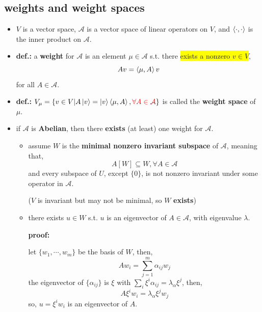 \subsection{weights and weight spaces}
\begin{itemize}
	\item $V$ is a vector space, $\mathcal{A}$ is a vector space of linear operators on $V$, and $\braket{\cdot, \cdot}$ is the inner product on $\mathcal{A}$.
	
	\item \textbf{def.:} a \textbf{weight} for $\mathcal{A}$ is an element $\mu \in \mathcal{A}$ s.t. there \colorbox{yellow}{exists a nonzero $v \in V$},
	\begin{equation}
		A v = \braket{\mu, A} v
	\end{equation}
	for all $A \in \mathcal{A}$.
	
	\item \textbf{def.:} $V_\mu = \{v \in V | A \ket{v} = \ket{v} \braket{\mu, A}, \mathcolor{red}{\forall A \in \mathcal{A}}\}$ is called the \textbf{weight space} of $\mu$.
	
	\item if $\mathcal{A}$ is \textbf{Abelian}, then there \textbf{exists} (at least) one weight for $\mathcal{A}$.
	
	\begin{tcolorbox}[title=proof:]
		\begin{itemize}
			\item assume $W$ is the \textbf{minimal nonzero invariant subspace} of $\mathcal{A}$, meaning that,
			\begin{equation}
				A[W] \subseteq W, \forall A \in \mathcal{A}
			\end{equation}
			and every subspace of $U$, except $\{0\}$, is not nonzero invariant under some operator in $\mathcal{A}$.
			
			($V$ is invariant but may not be minimal, so $W$ \textbf{exists})
			
			\item there exists $u \in W$ s.t. $u$ is an eigenvector of $A \in \mathcal{A}$, with eigenvalue $\lambda$.
			
			\noindent\hdashrule[0.5ex]{\linewidth}{0.5pt}{1mm} %
			
			\textbf{proof:}
			
			let $\{w_1, \cdots, w_m\}$ be the basis of $W$, then,
			\begin{equation}
				A w_i = \sum_{j = 1}^m \alpha_{i j} w_j
			\end{equation}
			the eigenvector of $\{\alpha_{i j}\}$ is $\xi$ with $\sum_i \xi^i \alpha_{i j} = \lambda_\alpha \xi^j$, then,
			\begin{equation}
				A \xi^i w_i = \lambda_\alpha \xi^j w_j
			\end{equation}
			so, $u = \xi^i w_i$ is an eigenvector of $A$.
			

\end{itemize}
\end{tcolorbox}
\end{itemize}
